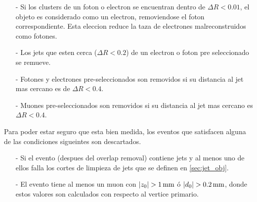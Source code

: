 \begin{itemize}\itemsep0.1cm
\item[-] Si los clusters de un foton o electron se encuentran dentro de $\Delta R < 0.01$,
  el objeto es considerado como un electron, removiendose el foton correspondiente. Esta
  eleccion reduce la taza de electrones malreconstruidos como fotones.
\item[-] Los jets que esten cerca ($\Delta R<0.2$) de un electron o foton pre seleccionado
  se remueve.
\item[-] Fotones y electrones pre-seleccionados son removidos si su distancia al jet mas
  cercano es de $\Delta R < 0.4$.
\item[-] Muones pre-seleccionados son removidos si su distancia al jet mas cercano es $\Delta R < 0.4$.
\end{itemize}

Para poder estar seguro que {\met} esta bien medida, los eventos que satisfacen
alguna de las condiciones sigueintes son descartados.
\begin{itemize}\itemsep0.1cm
\item[-] Si el evento (despues del overlap removal) contiene jets y al menos uno de ellos
  falla los cortes de limpieza de jets que se definen en {\Sec} \ref{sec:jet_obj}.
\item[-] El evento tiene al menos un muon con  $|z_{0}| >   \unit[1]{mm}$ ó
  $|d_0| > \unit[0.2]{mm}$, donde estos valores son calculados con respecto al vertice
  primario.
\end{itemize}


